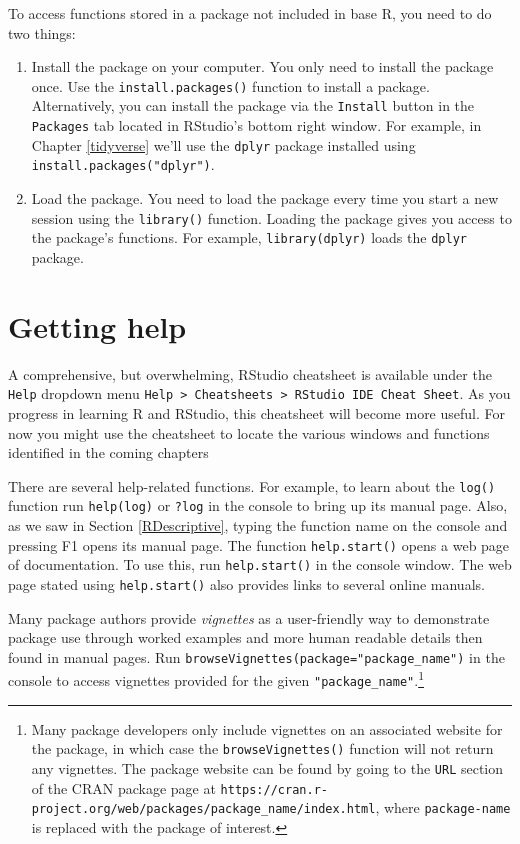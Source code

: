 \documentclass[
  11pt,
]{krantz}
\providecommand{\tightlist}{%
  \setlength{\itemsep}{0pt}\setlength{\parskip}{0pt}}
\theoremstyle{definition}
\theoremstyle{definition}
\theoremstyle{definition}
\theoremstyle{definition}
\theoremstyle{remark}
\begin{document}
To access functions stored in a package not included in base R, you need to do two things:

\begin{enumerate}
\def\labelenumi{\arabic{enumi}.}
\tightlist
\item
  Install the package on your computer. You only need to install the package once. Use the \texttt{install.packages()} function to install a package. Alternatively, you can install the package via the \texttt{Install} button in the \texttt{Packages} tab located in RStudio's bottom right window. For example, in Chapter \ref{tidyverse} we'll use the \texttt{dplyr} package installed using \texttt{install.packages("dplyr")}.
\item
  Load the package. You need to load the package every time you start a new session using the \texttt{library()} function. Loading the package gives you access to the package's functions. For example, \texttt{library(dplyr)} loads the \texttt{dplyr} package.
\end{enumerate}

\hypertarget{getting-help}{%
\section{Getting help}\label{getting-help}}

A comprehensive, but overwhelming, RStudio cheatsheet is available under the \texttt{Help} dropdown menu \texttt{Help\ \textgreater{}\ Cheatsheets\ \textgreater{}\ RStudio\ IDE\ Cheat\ Sheet}. As you progress in learning R and RStudio, this cheatsheet will become more useful. For now you might use the cheatsheet to locate the various windows and functions identified in the coming chapters

There are several help-related functions. For example, to learn about the \texttt{log()} function run \texttt{help(log)} or \texttt{?log} in the console to bring up its manual page. Also, as we saw in Section \ref{RDescriptive}, typing the function name on the console and pressing F1 opens its manual page. The function \texttt{help.start()} opens a web page of documentation. To use this, run \texttt{help.start()} in the console window. The web page stated using \texttt{help.start()} also provides links to several online manuals.

Many package authors provide \emph{vignettes} as a user-friendly way to demonstrate package use through worked examples and more human readable details then found in manual pages. Run \texttt{browseVignettes(package="package\_name")} in the console to access vignettes provided for the given \texttt{"package\_name"}.\footnote{Many package developers only include vignettes on an associated website for the package, in which case the \texttt{browseVignettes()} function will not return any vignettes. The package website can be found by going to the \texttt{URL} section of the CRAN package page at \texttt{https://cran.r-project.org/web/packages/package\_name/index.html}, where \texttt{package-name} is replaced with the package of interest.}
\end{document}
